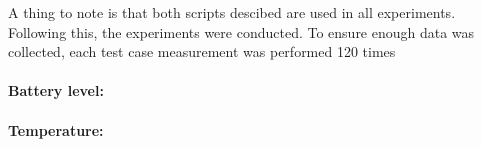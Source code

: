 A thing to note is that both scripts descibed are used in all experiments. Following this, the experiments were conducted. To ensure enough data was collected, each test case measurement was performed 120 times



\paragraph{Battery level:}




\paragraph{Temperature:}







